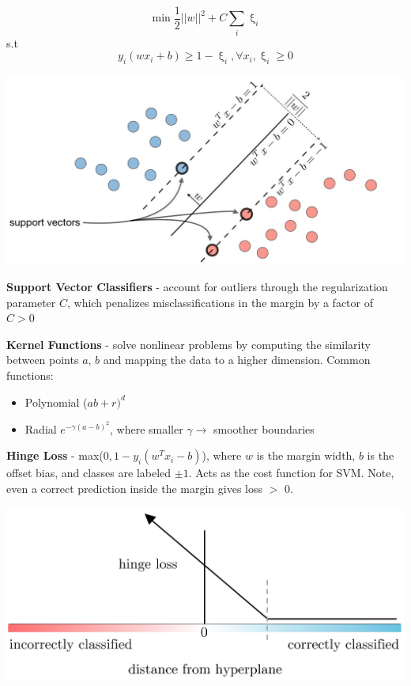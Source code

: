 \documentclass[10pt,landscape]{article}
\begin{document}
\begin{multicols}{3}
    $$\min \frac{1}{2}||w||^2 + C \sum_i \upxi_i $$
    s.t $$y_i(wx_i+b)\geq 1-\upxi_i, \forall x_i, \upxi_i\geq 0 $$
    \vspace{-2.5mm}
    \begin{center}
        \includegraphics[scale = .23]{images/svmNew2.JPG}
    \end{center}

    \vspace{-2mm}
    \textbf{Support Vector Classifiers} - account for outliers through the regularization parameter $C$, which penalizes misclassifications in the margin by a factor of $C > 0$

    \textbf{Kernel Functions} - solve nonlinear problems by computing the similarity between points $a$, $b$ and mapping the data to a higher dimension. Common functions:
    \begin{itemize}[label={--},leftmargin=4mm]
        \vspace{-1mm}
        \itemsep -.4mm
        \item Polynomial ($ab + r)^d$
        \item Radial $e^{-\gamma(a-b)^2}$, where smaller $\gamma \to$  smoother boundaries
    \end{itemize}

    \textbf{Hinge Loss} - max($0,1-y_i(w^T x_i - b)$), where
    $w$ is the margin width, $b$ is the offset bias, and classes are labeled $\pm1$. Acts as the cost function for SVM. Note, even a correct prediction inside the margin gives loss $>$ 0.
    \vspace{-1mm}
    \begin{center}
        \includegraphics[scale = .105]{images/hingeloss3.JPG}
    \end{center}
    \vspace{-3.5mm}

\end{multicols}
\end{document}

